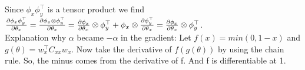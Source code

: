 \documentclass[a4paper]{article}
\newcommand{\E}{\mathbb{E}}
\newcommand{\wx}{{w_{x}}}
\newcommand{\wxt}{w_{x}^\top}
\newcommand{\Cxx}{C_{xx}}
\newcommand{\1}{\mathds{1}}
\begin{document}
Since $\phi_x\phi_y^\top$ is a tensor product we find
$
{\partial\phi_x\phi_y^\top\over\partial\theta_x} 
= {\partial\phi_x\otimes\phi_y^\top\over\partial\theta_x}
= {\partial\phi_x\over\partial\theta_x}\otimes\phi_y^\top
+ \phi_x\otimes{\partial\phi_y^\top\over\partial\theta_x}
= {\partial\phi_x\over\partial\theta_x}\otimes\phi_y^\top
$.
\\
Explanation why $\alpha$ became $-\alpha$ in the gradient: Let $f(x) = min(0,1-x)$
and $g(\theta) = \wxt\Cxx\wx$. Now take the derivative of $f(g(\theta))$
by using the chain rule. So, the minus comes from the derivative of f. 
And f is differentiable at 1.    
\\
\\
\\
\end{document}
